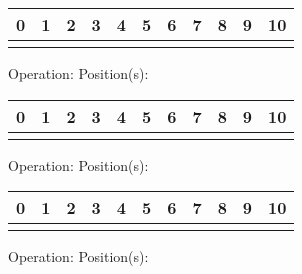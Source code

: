 {{        \begin{center}
            \begin{tabular}{|P{0.75cm}|P{0.75cm}|P{0.75cm}|P{0.75cm}|P{0.75cm}|P{0.75cm}|P{0.75cm}|P{0.75cm}|P{0.75cm}|P{0.75cm}|P{0.75cm}|}
                 & 1 & 2 & 3 & 4 & 5 & 6 & 7 & 8 & 9 & 10  \\
                \hline
                &&&&&&&&&& \\
                \hline
            \end{tabular}
        \end{center}
        Operation: \underline{\hspace{3cm}} \hspace{10px} Position(s): \underline{\hspace{2cm}}
        \begin{center}
            \begin{tabular}{|P{0.75cm}|P{0.75cm}|P{0.75cm}|P{0.75cm}|P{0.75cm}|P{0.75cm}|P{0.75cm}|P{0.75cm}|P{0.75cm}|P{0.75cm}|P{0.75cm}|}
                 & 1 & 2 & 3 & 4 & 5 & 6 & 7 & 8 & 9 & 10  \\
                \hline
                &&&&&&&&&& \\
                \hline
            \end{tabular}
        \end{center}
        Operation: \underline{\hspace{3cm}} \hspace{10px} Position(s): \underline{\hspace{2cm}}
        \begin{center}
            \begin{tabular}{|P{0.75cm}|P{0.75cm}|P{0.75cm}|P{0.75cm}|P{0.75cm}|P{0.75cm}|P{0.75cm}|P{0.75cm}|P{0.75cm}|P{0.75cm}|P{0.75cm}|}
                 & 1 & 2 & 3 & 4 & 5 & 6 & 7 & 8 & 9 & 10  \\
                \hline
                &&&&&&&&&& \\
                \hline
            \end{tabular}
        \end{center}
        Operation: \underline{\hspace{3cm}} \hspace{10px} Position(s): \underline{\hspace{2cm}}
        \begin{center}
            \begin{tabular}{|P{0.75cm}|P{0.75cm}|P{0.75cm}|P{0.75cm}|P{0.75cm}|P{0.75cm}|P{0.75cm}|P{0.75cm}|P{0.75cm}|P{0.75cm}|P{0.75cm}|}

\end{tabular}
\end{center}}}
